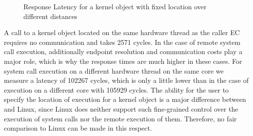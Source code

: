 \begin{figure}[ht!]
  \begin{center}
    \caption{Response Latency for a kernel object with fixed location over different distances}
    \label{fig:syscall-latency-fixed-location}
  \end{center}
\end{figure}

A call to a kernel object located on the same hardware thread as the caller EC
requires no communication and takes \num{2571} cycles. In the case of remote
system call execution, additionally endpoint resolution and communication costs
play a major role, which is why the response times are much higher in these
cases. For system call execution on a different hardware thread on the same core
we measure a latency of \num{102267} cycles, which is only a little lower than
in the case of execution on a different core with \num{105929} cycles. The
ability for the user to specify the location of execution for a kernel object is
a major difference between \mythos and Linux, since Linux does neither support
such fine-grained control over the execution of system calls nor the remote
execution of them. Therefore, no fair comparison to Linux can be made in this
respect.

